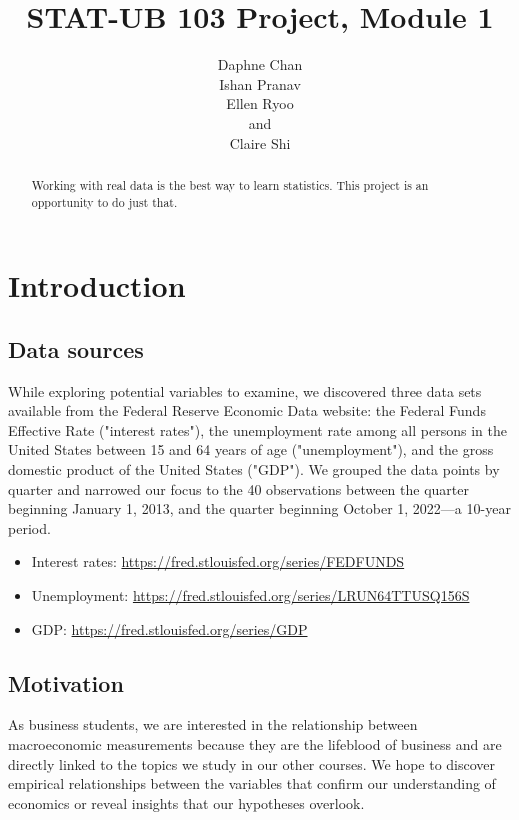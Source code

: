\documentclass[12pt]{article}
\begin{document}
\def\spacingset#1{\renewcommand{\baselinestretch}
{#1}\small\normalsize} \spacingset{1}
\title{\bf STAT-UB 103 Project, Module 1}
\author{Daphne Chan\\
Ishan Pranav\\
Ellen Ryoo\\
and\\
Claire Shi}
\maketitle
\bigskip
\begin{abstract}
Working with real data is the best way to learn statistics. This project is an opportunity to do just that.
\end{abstract}
\newpage
\spacingset{1.08}
\section{Introduction}
\label{sec:introduction}
\subsection{Data sources}
While exploring potential variables to examine, we discovered three data sets available from the Federal Reserve Economic Data website: the Federal Funds Effective Rate ("interest rates"), the unemployment rate among all persons in the United States between 15 and 64 years of age ("unemployment"), and the gross domestic product of the United States ("GDP"). We grouped the data points by quarter and narrowed our focus to the 40 observations between the quarter beginning January 1, 2013, and the quarter beginning October 1, 2022---a 10-year period. 
\begin{itemize}
\item Interest rates: \url{https://fred.stlouisfed.org/series/FEDFUNDS}
\item Unemployment: \url{https://fred.stlouisfed.org/series/LRUN64TTUSQ156S}
\item GDP: \url{https://fred.stlouisfed.org/series/GDP}
\end{itemize}
\subsection{Motivation}
As business students, we are interested in the relationship between macroeconomic measurements because they are the lifeblood of business and are directly linked to the topics we study in our other courses. We hope to discover empirical relationships between the variables that confirm our understanding of economics or reveal insights that our hypotheses overlook. 
\end{document}
